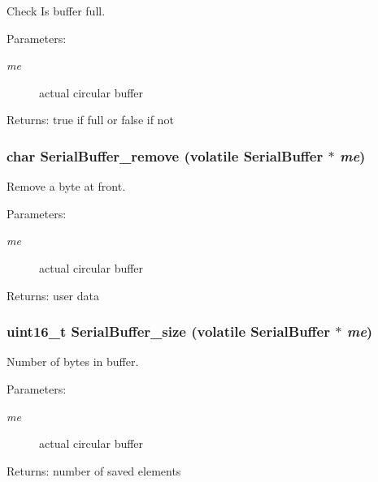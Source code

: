 Check Is buffer full. \begin{Desc}
\item[Parameters:]
\begin{description}
\item[{\em me}]actual circular buffer \end{description}
\end{Desc}
\begin{Desc}
\item[Returns:]true if full or false if not \end{Desc}
\hypertarget{group___serial_g71d90db4bcb16a30c48d68c8ec1d2df2}{
\subsubsection[{SerialBuffer\_\-remove}]{\setlength{\rightskip}{0pt plus 5cm}char SerialBuffer\_\-remove (volatile {\bf SerialBuffer} $\ast$ {\em me})}}
\label{group___serial_g71d90db4bcb16a30c48d68c8ec1d2df2}


Remove a byte at front. \begin{Desc}
\item[Parameters:]
\begin{description}
\item[{\em me}]actual circular buffer \end{description}
\end{Desc}
\begin{Desc}
\item[Returns:]user data \end{Desc}
\hypertarget{group___serial_g069daa68af8643f07570329943ddfed0}{
\subsubsection[{SerialBuffer\_\-size}]{\setlength{\rightskip}{0pt plus 5cm}uint16\_\-t SerialBuffer\_\-size (volatile {\bf SerialBuffer} $\ast$ {\em me})}}
\label{group___serial_g069daa68af8643f07570329943ddfed0}


Number of bytes in buffer. \begin{Desc}
\item[Parameters:]
\begin{description}
\item[{\em me}]actual circular buffer \end{description}
\end{Desc}
\begin{Desc}
\item[Returns:]number of saved elements \end{Desc}


